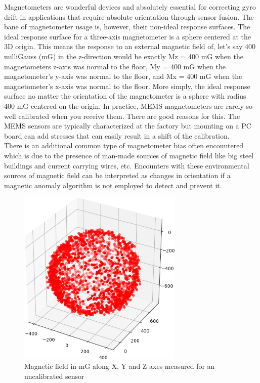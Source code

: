 \documentclass[a4paper,12pt,oneside]{book}
\begin{document}
Magnetometers are wonderful devices and absolutely essential for correcting gyro drift in applications that require absolute orientation through sensor fusion. The bane of magnetometer usage is, however, their non-ideal response surfaces. The ideal response surface for a three-axis magnetometer is a sphere centered at the 3D origin. This means the response to an external magnetic field of, let's say 400 milliGauss (mG) in the z-direction would be exactly Mz = 400 mG when the magnetometers z-axis was normal to the floor, My = 400 mG when the magnetometer's y-axis was normal to the floor, and Mx = 400 mG when the magnetometer's x-axis was normal to the floor. More simply, the ideal response surface no matter the orientation of the magnetometer is a sphere with radius 400 mG centered on the origin. In practice, MEMS magnetometers are rarely so well calibrated when you receive them. There are good reasons for this. The MEMS sensors are typically characterized at the factory but mounting on a PC board can add stresses that can easily result in a shift of the calibration.\cite{kris}\\

There is an additional common type of magnetometer bias often encountered which is due to the presence of man-made sources of magnetic field like big steel buildings and current carrying wires, etc. Encounters with these environmental sources of magnetic field can be interpreted as changes in orientation if a magnetic anomaly algorithm is not employed to detect and prevent it.\cite{kris}\\

\begin{figure}[!htb]
\centering
\includegraphics[width=0.7\textwidth]{images/raw}
\caption{Magnetic field in mG along X, Y and Z axes measured for an uncalibrated sensor}
\label{fig:magraw}
\end{figure}
\end{document}
